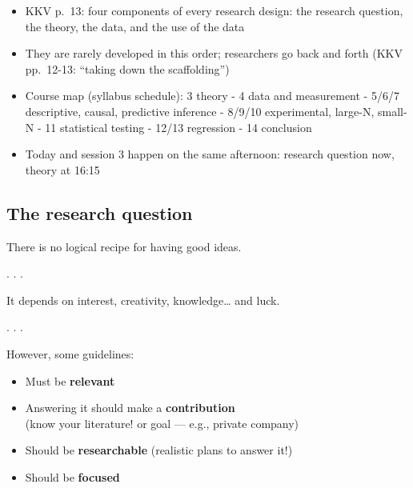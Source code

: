 \documentclass[
  letterpaper,
  DIV=11,
  numbers=noendperiod]{scrartcl}
\providecommand{\tightlist}{%
  \setlength{\itemsep}{0pt}\setlength{\parskip}{0pt}}
\begin{document}
\begin{itemize}
\tightlist
\item
  KKV p.~13: four components of every research design: the research
  question, the theory, the data, and the use of the data
\item
  They are rarely developed in this order; researchers go back and forth
  (KKV pp.~12-13: ``taking down the scaffolding'')
\item
  Course map (syllabus schedule): 3 theory - 4 data and measurement -
  5/6/7 descriptive, causal, predictive inference - 8/9/10 experimental,
  large-N, small-N - 11 statistical testing - 12/13 regression - 14
  conclusion
\item
  Today and session 3 happen on the same afternoon: research question
  now, theory at 16:15
\end{itemize}

\subsection{The research question}\label{the-research-question}

There is no logical recipe for having good ideas.

. . .

It depends on interest, creativity, knowledge\ldots{} and luck.

. . .

However, some guidelines:

\begin{itemize}
\tightlist
\item
  Must be \textbf{relevant}\\
\item
  Answering it should make a \textbf{contribution}\\
  (know your literature! or goal --- e.g., private company)\\
\item
  Should be \textbf{researchable} (realistic plans to answer it!)
\item
  Should be \textbf{focused}
\end{itemize}
\end{document}

